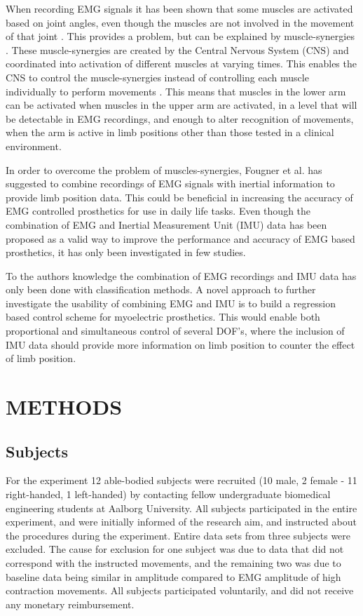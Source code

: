 \documentclass[a4paper, 10pt, conference]{ieeeconf}      %
\begin{document}
When recording EMG signals it has been shown that some muscles are activated based on joint angles, even though the muscles are not involved in the movement of that joint \cite{Fougner2011}. This provides a problem, but can be explained by muscle-synergies \cite{DeRugy2013}. These muscle-synergies are created by the Central Nervous System (CNS) and coordinated into activation of different muscles at varying times. This enables the CNS to control the muscle-synergies instead of controlling each muscle individually to perform movements \cite{jiang2009}. This means that muscles in the lower arm can be activated when muscles in the upper arm are activated, in a level that will be detectable in EMG recordings, and enough to alter recognition of movements, when the arm is active in limb positions other than those tested in a clinical environment. 

In order to overcome the problem of muscles-synergies, Fougner et al. \cite{Fougner2011} has suggested to combine recordings of EMG signals with inertial information to provide limb position data. This could be beneficial in increasing the accuracy of EMG controlled prosthetics for use in daily life tasks. 
Even though the combination of EMG and Inertial Measurement Unit (IMU) data has been proposed as a valid way to improve the performance and accuracy of EMG based prosthetics, it has only been investigated in few studies. \cite{Roy2010, Imtiaz2014, jiang2012}

To the authors knowledge the combination of EMG recordings and IMU data has only been done with classification methods. A novel approach to further investigate the usability of combining EMG and IMU is to build a regression based control scheme for myoelectric prosthetics. This would enable both proportional and simultaneous control of several DOF's, where the inclusion of IMU data should provide more information on limb position to counter the effect of limb position.		
	
\section{METHODS}%
	
%		
\subsection{Subjects}
For the experiment 12 able-bodied subjects were recruited (10 male, 2 female - 11 right-handed, 1 left-handed) by contacting fellow undergraduate biomedical engineering students at Aalborg University. All subjects participated in the entire experiment, and were initially informed of the research aim, and instructed about the procedures during the experiment. Entire data sets from three subjects were excluded. The cause for exclusion for one subject was due to data that did not correspond with the instructed movements, and the remaining two was due to baseline data being similar in amplitude compared to EMG amplitude of high contraction movements. All subjects participated voluntarily, and did not receive any monetary reimbursement. 
\end{document}
